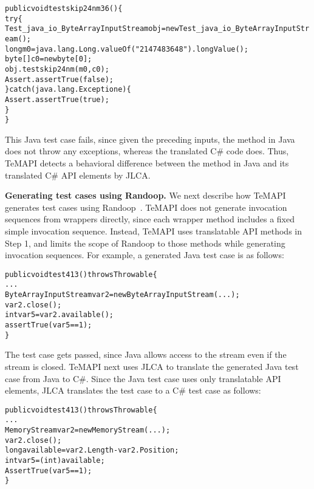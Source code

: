 \begin{CodeOut}%
\begin{alltt}
public void testskip24nm36()\{
  try\{
     Test_java_io_ByteArrayInputStream obj = new Test_java_io_ByteArrayInputStream();
     long m0 = java.lang.Long.valueOf("2147483648").longValue();
     byte[] c0 = new byte[0];
     obj.testskip24nm(m0,c0);
     Assert.assertTrue(false);
  \}catch(java.lang.Exception e)\{
     Assert.assertTrue(true);
  \}
\}
\end{alltt}
\end{CodeOut}%

This Java test case fails, since given the preceding inputs, the  method in Java does not throw any exceptions, whereas the translated C\# code does. Thus, TeMAPI detects a behavioral difference between the  method in Java and its translated C\# API elements by JLCA.

\textbf{Generating test cases using Randoop.} We next describe how TeMAPI generates test cases using Randoop~\cite{pacheco2007feedback}. TeMAPI does not generate invocation sequences from wrappers directly, since each wrapper method includes a fixed simple invocation sequence. Instead, TeMAPI uses translatable API methods in Step 1, and limits the scope of Randoop to those methods while generating invocation sequences. For example, a generated Java test case is as follows:

\begin{CodeOut}%
\begin{alltt}
public void test413() throws Throwable \{
  ...
  ByteArrayInputStream var2=new ByteArrayInputStream(...);
  var2.close();
  int var5=var2.available();
  assertTrue(var5 == 1);
\}
\end{alltt}
\end{CodeOut}%


The test case gets passed, since Java allows access to the stream even if the stream is closed. TeMAPI next uses JLCA to translate the generated Java test case from Java to C\#. Since the Java test case uses only translatable API elements, JLCA translates the test case to a C\# test case as follows:

\begin{CodeOut}%
\begin{alltt}
public void test413() throws Throwable\{
  ...
  MemoryStream var2 = new MemoryStream(...);
  var2.close();
  long available = var2.Length - var2.Position;
  int var5 = (int) available;
  AssertTrue(var5 == 1);
\}
\end{alltt}
\end{CodeOut}%

